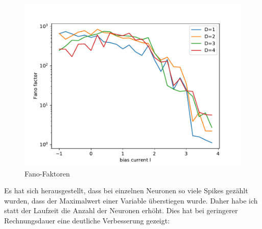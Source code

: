 \documentclass[12pt,a4paper]{article}
\begin{document}
\begin{figure}[H]
	\centering
	\includegraphics[scale=0.9]{fneurs.pdf} 
	\caption{Fano-Faktoren}
	\label{fnc}
\end{figure} 
Es hat sich herausgestellt, dass bei einzelnen Neuronen so viele Spikes gezählt wurden, dass der Maximalwert einer Variable überstiegen wurde. Daher habe ich statt der Laufzeit die Anzahl der Neuronen erhöht. Dies hat bei geringerer Rechnungsdauer eine deutliche Verbesserung gezeigt:
\end{document}
